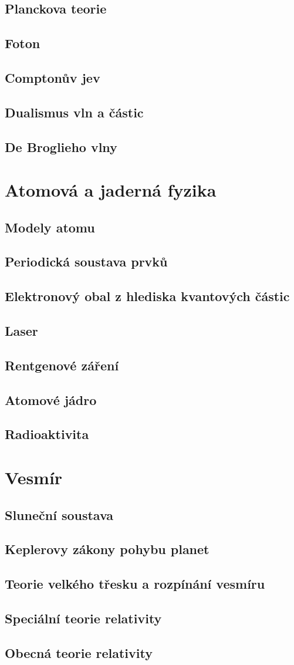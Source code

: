 \documentclass[titlepage]{book}
\begin{document}
\section{Planckova teorie}
\section{Foton}
\section{Comptonův jev}
\section{Dualismus vln a částic}
\section{De Broglieho vlny}
\chapter{Atomová a jaderná fyzika}
\section{Modely atomu}
\section{Periodická soustava prvků}
\section{Elektronový obal z hlediska kvantových částic}
\section{Laser}
\section{Rentgenové záření}
\section{Atomové jádro}
\section{Radioaktivita}
\chapter{Vesmír}
\section{Sluneční soustava}
\section{Keplerovy zákony pohybu planet}
\section{Teorie velkého třesku a rozpínání vesmíru}
\section{Speciální teorie relativity}
\section{Obecná teorie relativity}
\end{document}
